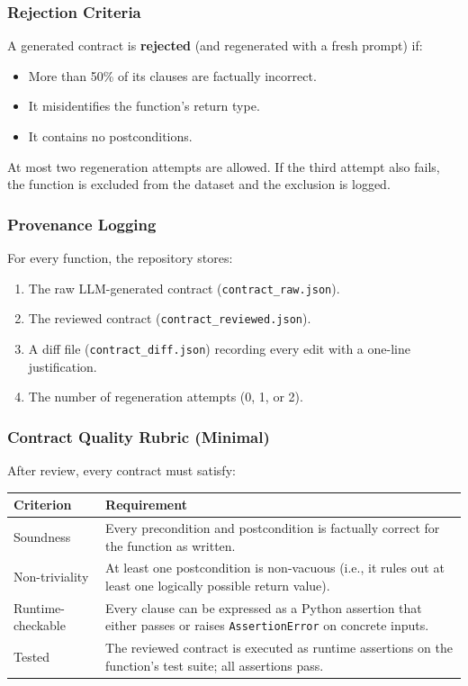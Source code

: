 \documentclass[11pt]{article}
\begin{document}
\subsubsection*{Rejection Criteria}

A generated contract is \textbf{rejected} (and regenerated with a
fresh prompt) if:
\begin{itemize}[nosep]
  \item More than 50\% of its clauses are factually incorrect.
  \item It misidentifies the function's return type.
  \item It contains no postconditions.
\end{itemize}
At most two regeneration attempts are allowed.  If the third attempt
also fails, the function is excluded from the dataset and the
exclusion is logged.

\subsubsection*{Provenance Logging}

For every function, the repository stores:
\begin{enumerate}[nosep]
  \item The raw LLM-generated contract (\texttt{contract\_raw.json}).
  \item The reviewed contract (\texttt{contract\_reviewed.json}).
  \item A diff file (\texttt{contract\_diff.json}) recording every
        edit with a one-line justification.
  \item The number of regeneration attempts (0, 1, or 2).
\end{enumerate}

\subsubsection*{Contract Quality Rubric (Minimal)}

After review, every contract must satisfy:
\begin{longtable}{@{}lp{8.5cm}@{}}
  \toprule
  \textbf{Criterion} & \textbf{Requirement} \\
  \midrule
  \endfirsthead
  Soundness &
    Every precondition and postcondition is factually correct for
    the function as written. \\
  \addlinespace
  Non-triviality &
    At least one postcondition is non-vacuous (i.e., it rules out at
    least one logically possible return value). \\
  \addlinespace
  Runtime-checkable &
    Every clause can be expressed as a Python assertion that either
    passes or raises \texttt{AssertionError} on concrete inputs. \\
  \addlinespace
  Tested &
    The reviewed contract is executed as runtime assertions on the
    function's test suite; all assertions pass. \\
  \bottomrule
\end{longtable}
\end{document}
